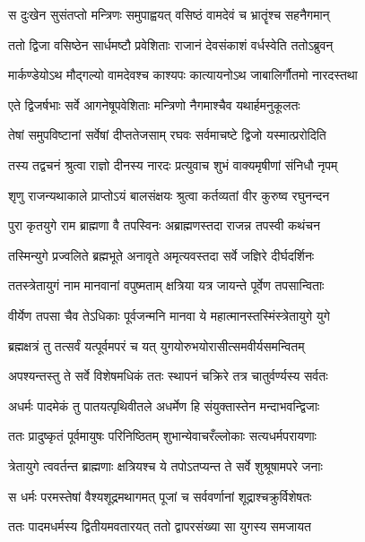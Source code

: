 \twolineshloka
{स दुःखेन सुसंतप्तो मन्त्रिणः समुपाह्वयत्}
{वसिष्ठं वामदेवं च भ्रातॄंश्च सहनैगमान्} %

\twolineshloka
{ततो द्विजा वसिष्ठेन सार्धमष्टौ प्रवेशिताः}
{राजानं देवसंकाशं वर्धस्वेति ततोऽब्रुवन्} %

\twolineshloka
{मार्कण्डेयोऽथ मौद्गल्यो वामदेवश्च काश्यपः}
{कात्यायनोऽथ जाबालिर्गौतमो नारदस्तथा} %

\twolineshloka
{एते द्विजर्षभाः सर्वे आगनेषूपवेशिताः}
{मन्त्रिणो नैगमाश्चैव यथार्हमनुकूलतः} %

\twolineshloka
{तेषां समुपविष्टानां सर्वेषां दीप्ततेजसाम्}
{रघवः सर्वमाचष्टे द्विजो यस्मात्प्ररोदिति} %

\twolineshloka
{तस्य तद्वचनं श्रुत्वा राज्ञो दीनस्य नारदः}
{प्रत्युवाच शुभं वाक्यमृषीणां संनिधौ नृपम्} %

\twolineshloka
{शृणु राजन्यथाकाले प्राप्तोऽयं बालसंक्षयः}
{श्रुत्वा कर्तव्यतां वीर कुरुष्व रघुनन्दन} %

\twolineshloka
{पुरा कृतयुगे राम ब्राह्मणा वै तपस्विनः}
{अब्राह्मणस्तदा राजन्न तपस्वी कथंचन} %

\twolineshloka
{तस्मिन्युगे प्रज्वलिते ब्रह्मभूते अनावृते}
{अमृत्यवस्तदा सर्वे जज्ञिरे दीर्घदर्शिनः} %

\twolineshloka
{ततस्त्रेतायुगं नाम मानवानां वपुष्मताम्}
{क्षत्रिया यत्र जायन्ते पूर्वेण तपसान्विताः} %

\twolineshloka
{वीर्येण तपसा चैव तेऽधिकाः पूर्वजन्मनि}
{मानवा ये महात्मानस्तस्मिंस्त्रेतायुगे युगे} %

\twolineshloka
{ब्रह्मक्षत्रं तु तत्सर्वं यत्पूर्वमपरं च यत्}
{युगयोरुभयोरासीत्समवीर्यसमन्वितम्} %

\twolineshloka
{अपश्यन्तस्तु ते सर्वे विशेषमधिकं ततः}
{स्थापनं चक्रिरे तत्र चातुर्वर्ण्यस्य सर्वतः} %

\twolineshloka
{अधर्मः पादमेकं तु पातयत्पृथिवीतले}
{अधर्मेण हि संयुक्तास्तेन मन्दाभवन्द्विजाः} %

\twolineshloka
{ततः प्रादुष्कृतं पूर्वमायुषः परिनिष्ठितम्}
{शुभान्येवाचरँल्लोकाः सत्यधर्मपरायणाः} %

\twolineshloka
{त्रेतायुगे त्ववर्तन्त ब्राह्मणाः क्षत्रियश्च ये}
{तपोऽतप्यन्त ते सर्वे शुश्रूषामपरे जनाः} %

\twolineshloka
{स धर्मः परमस्तेषां वैश्यशूद्रमथागमत्}
{पूजां च सर्ववर्णानां शूद्राश्चक्रुर्विशेषतः} %

\twolineshloka
{ततः पादमधर्मस्य द्वितीयमवतारयत्}
{ततो द्वापरसंख्या सा युगस्य समजायत} %

